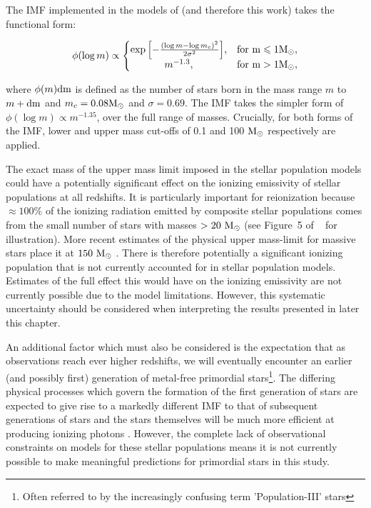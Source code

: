 The \citet{Chabrier:2003ki} IMF implemented in the models of \citet{Bruzual:2003ckb} (and therefore this work) takes the functional form:

\begin{equation}
\phi(\log{m}) \propto 
\left \{ 
\begin{matrix}
\exp {\left [- \frac{(\log{m} - \log{m_{c}})^2}{2\sigma^{2}} \right ]}, & \rm{for}~m \leq 1\rm{M}_{\odot}, \\ 
m^{-1.3}, & \rm{for}~m > 1\rm{M}_{\odot}, 
\end{matrix}	
\right.
\end{equation}

where $\phi(m) \rm{d}m$ is defined as the number of stars born in the mass range $m$ to $m + \rm{d}m$ and $m_{c} = 0.08 \rm{M}_{\odot}$ and $\sigma = 0.69$. The \citet{Salpeter:1955hz} IMF takes the simpler form of $\phi(\log{m}) \propto m^{-1.35}$, over the full range of masses. Crucially, for both forms of  the IMF, lower and upper mass cut-offs of 0.1 and 100 $\rm{M}_{\odot}$ respectively are applied.

The exact mass of the upper mass limit imposed in the stellar population models could have a potentially significant effect on the ionizing emissivity of stellar populations at all redshifts. It is particularly important for reionization because $\approx 100\%$ of the ionizing radiation emitted by composite stellar populations comes from the small number of stars with masses $> 20~\rm{M}_{\odot}$ (see Figure~5 of \citeauthor{Conroy:2013dk}~\citeyear{Conroy:2013dk} for illustration). More recent estimates of the physical upper mass-limit for massive stars place it at $150~\rm{M}_{\odot}$  \citep{Zinnecker:2007hi}. There is therefore potentially a significant ionizing population that is not currently accounted for in stellar population models. Estimates of the full effect this would have on the ionizing emissivity are not currently possible due to the model limitations. However, this systematic uncertainty should be considered when interpreting the results presented in later this chapter.

An additional factor which must also be considered is the expectation that as observations reach ever higher redshifts, we will eventually encounter an earlier (and possibly first) generation of metal-free primordial stars\footnote{Often referred to by the increasingly confusing term 'Population-III' stars}. The differing physical processes which govern the formation of the first generation of stars are expected to give rise to a markedly different IMF to that of subsequent generations of stars \citep{Bromm:2002fe,Bromm:2013dk,Crosby:2013bp} and the stars themselves will be much more efficient at producing ionizing photons \citep{Schaerer:2002bm}. However, the complete lack of observational constraints on models for these stellar populations means it is not currently possible to make meaningful predictions for primordial stars in this study.
    

